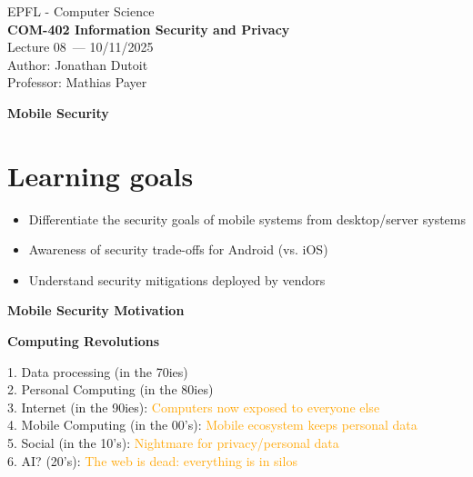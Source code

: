 \documentclass[11pt]{article}
\newcommand{\coursename}{COM-402 Information Security and Privacy}
\newcommand{\lecturenum}{08}
\newcommand{\lecturedate}{10/11/2025}
\newcommand{\professor}{Mathias Payer}
\begin{document}
\begin{center}
  {\large EPFL - Computer Science} \\[0.5em]
  {\Large \textbf{\coursename}} \\[0.5em]
  {\large Lecture \lecturenum\ --- \lecturedate} \\[0.5em]
  {\large Author: Jonathan Dutoit} \\[0.5em]
  {\large Professor: \professor} \\[0.5em]
\end{center}

\vspace{1cm}
\begin{center}
  {\LARGE \textbf{Mobile Security}}
\end{center}
\vspace{1cm}

\section*{Learning goals}

\begin{itemize}
	\item Differentiate the security goals of mobile systems from desktop/server systems
	\item Awareness of security trade-offs for Android (vs. iOS)
	\item Understand security mitigations deployed by vendors
\end{itemize}

\vspace{0.5cm}

\begin{center}
  {\LARGE \textbf{Mobile Security Motivation}}
\end{center}
\vspace{0.5cm}
\textbf{Computing Revolutions}

1. Data processing (in the 70ies) \\
2. Personal Computing (in the 80ies) \\
3. Internet (in the 90ies): \textcolor{orange}{Computers now exposed to everyone else}\\ 
4. Mobile Computing (in the 00's): \textcolor{orange}{Mobile ecosystem keeps personal data}\\
5. Social (in the 10's): \textcolor{orange}{Nightmare for privacy/personal data} \\
6. AI? (20's): \textcolor{orange}{The web is dead: everything is in silos}
\end{document}
